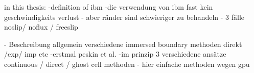 in this thesis:
-definition of ibm
-die verwendung von ibm fast kein geschwindigkeits verlust
- aber ränder sind schwieriger zu behandeln
- 3 fälle noslip/ noflux / freeslip
\newpage

- Beschreibung allgemein verschiedene immersed boundary methoden direkt /exp/ imp etc
    -erstmal peskin et al.
    -im prinzip 3 verschiedene ansätze continuous / direct /  ghost cell methoden
    - hier einfache methoden wegen gpu

\newpage

%
%
%
